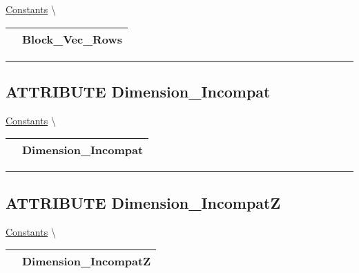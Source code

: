 \hypertarget{ecldoc:pbblas.constants.block_vec_rows}{}
\hspace{0pt} \hyperlink{ecldoc:PBblas.Constants}{Constants} \textbackslash 

{\renewcommand{\arraystretch}{1.5}
\begin{tabularx}{\textwidth}{|>{\raggedright\arraybackslash}l|X|}
\hline
\hspace{0pt}\mytexttt{\color{red} } & \textbf{Block\_Vec\_Rows} \\
\hline
\end{tabularx}
}

\par


\rule{\linewidth}{0.5pt}
\subsection*{\textsf{\colorbox{headtoc}{\color{white} ATTRIBUTE}
Dimension\_Incompat}}

\hypertarget{ecldoc:pbblas.constants.dimension_incompat}{}
\hspace{0pt} \hyperlink{ecldoc:PBblas.Constants}{Constants} \textbackslash 

{\renewcommand{\arraystretch}{1.5}
\begin{tabularx}{\textwidth}{|>{\raggedright\arraybackslash}l|X|}
\hline
\hspace{0pt}\mytexttt{\color{red} } & \textbf{Dimension\_Incompat} \\
\hline
\end{tabularx}
}

\par


\rule{\linewidth}{0.5pt}
\subsection*{\textsf{\colorbox{headtoc}{\color{white} ATTRIBUTE}
Dimension\_IncompatZ}}

\hypertarget{ecldoc:pbblas.constants.dimension_incompatz}{}
\hspace{0pt} \hyperlink{ecldoc:PBblas.Constants}{Constants} \textbackslash 

{\renewcommand{\arraystretch}{1.5}
\begin{tabularx}{\textwidth}{|>{\raggedright\arraybackslash}l|X|}
\hline
\hspace{0pt}\mytexttt{\color{red} } & \textbf{Dimension\_IncompatZ} \\
\hline
\end{tabularx}
}


